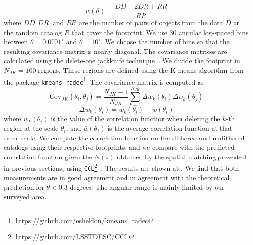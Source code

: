 \documentclass[twocolumn]{aastex62}
\begin{document}
\begin{equation}
w(\theta) = \frac{DD - 2 DR + RR}{RR}
\end{equation}
where $DD, DR$, and $RR$ are the number of pairs of objects from the data $D$ or the random catalog $R$ that cover the footprint. We use 30 angular log-spaced bins between $\theta=0.0001^{\circ}$ and $\theta=10^{\circ}$. We choose the number of bins so that the resulting covariance matrix is nearly diagonal. The covariance matrices are calculated using the delete-one jackknife technique~\citep{Shao:1986:DJB,2009MNRAS.396...19N}. We divide the footprint in $N_{JK}=100$ regions. These regions are defined using the K-means algorithm from the package \texttt{kmeans\_radec}\footnote{\url{https://github.com/esheldon/kmeans\_radec}}. The covariance matrix is computed as
\begin{equation}
\mathrm{Cov}_{JK}(\theta_{i},\theta_{j})=\frac{N_{JK}-1}{N_{JK}}\sum_{k=1}^{N_{JK}}\Delta w_{k}(\theta_{i}) \Delta w_{k}(\theta_{j})
\end{equation}
\begin{equation}
\Delta w_{k}(\theta_{i}) = w_{k}(\theta_{i})-\bar{w}(\theta_{i})
\end{equation}
where $w_{k}(\theta_{i})$ is the value of the correlation function when deleting the $k$-th region at the scale $\theta_{i}$, and $\bar{w}(\theta_{i})$ is the average correlation function at that same scale. We compute the correlation function on the dithered and undithered catalogs using their respective footprints, and we compare with the predicted correlation function given the $N(z)$ obtained by the spatial matching presented in previous sections, using \texttt{CCL}\footnote{https://github.com/LSSTDESC/CCL}~\citep{CCL}. The results are shown at . We find that both measurements are in good agreement and in agreement with the theoretical prediction for $\theta < 0.3$ degrees. The angular range is mainly limited by our surveyed area.
\end{document}

